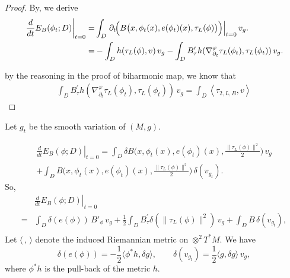 \documentclass[12pt,UTF8]{article}
\theoremstyle{plain}
\theoremstyle{definition}
\renewcommand{\(}{\left(}
\renewcommand{\)}{\right)}
\numberwithin{equation}{subsection}
\renewcommand{\(}{\left(}
\renewcommand{\)}{\right)}
\numberwithin{equation}{section}
\begin{document}
\begin{proof}
By\cite{zbMATH06527253}, we derive 
	\begin{equation}
		\begin{split}
			\left.\frac{d}{dt}E_{B}(\phi_t;D)\right|_{t=0}
			=& \int_D \left.\partial_t\!\Bigl(B\bigl(x,\phi_t(x),e(\phi_t)(x),\tau_{L}(\phi)\bigr)\Bigr)\right|_{t=0}v_g.\\
			=&-\int_D h(\tau_L(\phi),v)\,v_g-\int_DB^\prime_\tau h(\nabla^\varphi_{\partial_t}\tau_L(\phi_t),\tau_L(\phi_t))\,v_g.
		\end{split}
	\end{equation}
	
by the reasoning in the proof of biharmonic map, we know that 	
	\begin{equation}
		\begin{split}
			\int_DB^\prime_\tau h(\nabla^\varphi_{\partial_t}\tau_L(\phi_t),\tau_L(\phi_t))\,v_g=\int_D \left\langle \tau_{2,L,B} ,v \right\rangle
		\end{split}
	\end{equation}
\end{proof}


Let $g_t$ be the smooth variation of $(M,g)$.

\begin{equation}
	\begin{split}
		\left.\frac{d}{dt}E_B(\phi;D)\right|_{t=0}
		= \int_D \delta\!B\bigl(x,\phi_t(x),e(\phi_t)(x),\frac{\|\tau_L(\phi)\|^2}{2}\bigr)\,v_g
		\\
		+ \int_DB\bigl(x,\phi_t(x),e(\phi_t)(x),\frac{\|\tau_L(\phi)\|^2}{2}\bigr)\,\delta(v_{g_t}).
	\end{split}
\end{equation}
So,
\begin{equation}
	\begin{split}
		&\left.\frac{d}{dt}E_B(\phi;D)\right|_{t=0}\\
		=& \int_D \delta(e(\phi))\,B'_\phi\,v_g
		+\frac{1}{2}\int_D B^\prime_\tau\delta(\|\tau_L(\phi)\|^2)\,v_g	+ \int_D B\,\delta(v_{g_t}),\\
	\end{split}
\end{equation}
Let $\langle\,,\,\rangle$ denote the induced Riemannian metric on $\otimes^2 T^*M$. We have
\begin{equation}\label{eq:delta}
	\delta(e(\phi)) = -\frac{1}{2}\langle\phi^*h,\delta g\rangle,\qquad
	\delta(v_{g_t}) = \frac{1}{2}\langle g,\delta g\rangle\,v_g,
\end{equation}
where $\phi^*h$ is the pull-back of the metric $h$.
\end{document}
